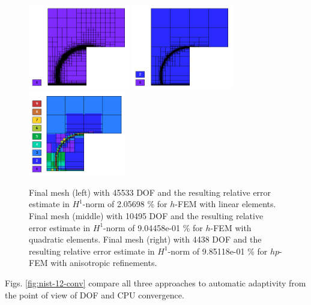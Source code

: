 \documentclass[12pt]{elsarticle}
\begin{document}
\begin{figure}[H]
\centering
\vspace{-3mm}
\includegraphics[height=3.7cm]{nist/nist-12/mesh_h1_aniso.png}
\includegraphics[height=3.7cm]{nist/nist-12/mesh_h2_aniso.png}
\includegraphics[height=3.7cm]{nist/nist-12/mesh_hp_aniso.png}
\vspace{-3mm}
\caption{
Final mesh (left) with 45533 DOF and the resulting
relative error estimate in $H^1$-norm of 2.05698 \% for $h$-FEM with linear elements.
Final mesh (middle) with 10495 DOF and the resulting
relative error estimate in $H^1$-norm of 9.04458e-01 \% for $h$-FEM with quadratic elements.
Final mesh (right) with 4438 DOF and the resulting
relative error estimate in $H^1$-norm of 9.85118e-01 \% for $hp$-FEM with anisotropic refinements.}
\label{fig:nist-12-hp-aniso}
\end{figure}

Figs. \ref{fig:nist-12-conv} compare all
three approaches to automatic adaptivity from the point
of view of DOF and CPU convergence.
\end{document}
